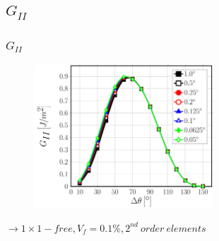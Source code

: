 \documentclass[first,firstsupp,lastsupp,last,hyperref,table]{ETHclass}
\begin{document}
\subsection{$G_{II}$}

%

\begin{frame}
\frametitle{\vspace{0.25cm}\small $G_{II}$}
\vspace{-.75cm}
\centering
\begin{figure}
\centering
\includegraphics[width=0.6\textwidth]{Vf0_1-free-2nd-GII.pdf}
\end{figure}
$\rightarrow 1\times1-free, V_{f}=0.1\%, 2^{nd}\ order\ elements$ 
\end{frame}

%
%
%
\end{document}
